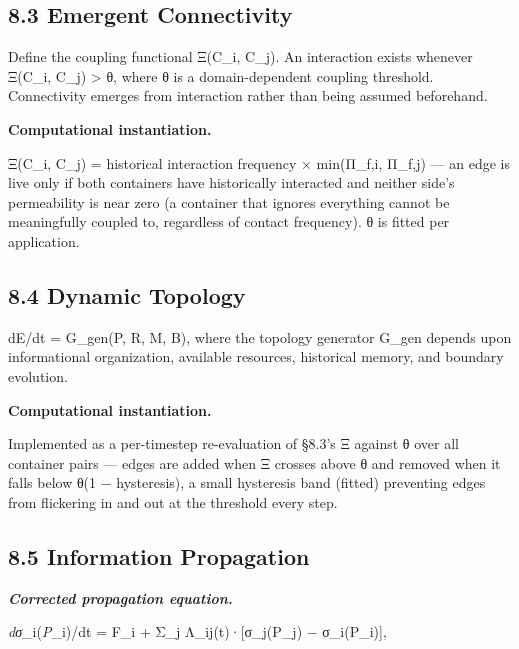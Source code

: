 \documentclass[
]{article}
\begin{document}
\hypertarget{emergent-connectivity}{%
\subsection{8.3 Emergent Connectivity}\label{emergent-connectivity}}

Define the coupling functional Ξ(C\_i, C\_j). An interaction exists
whenever Ξ(C\_i, C\_j) \textgreater{} θ, where θ is a domain-dependent
coupling threshold. Connectivity emerges from interaction rather than
being assumed beforehand.

\textbf{Computational instantiation.}

Ξ(C\_i, C\_j) = historical interaction frequency × min(Π\_f,i, Π\_f,j)
--- an edge is live only if both containers have historically interacted
and neither side's permeability is near zero (a container that ignores
everything cannot be meaningfully coupled to, regardless of contact
frequency). θ is fitted per application.

\hypertarget{dynamic-topology}{%
\subsection{8.4 Dynamic Topology}\label{dynamic-topology}}

dE/dt = G\_gen(P, R, M, B), where the topology generator G\_gen depends
upon informational organization, available resources, historical memory,
and boundary evolution.

\textbf{Computational instantiation.}

Implemented as a per-timestep re-evaluation of §8.3's Ξ against θ over
all container pairs --- edges are added when Ξ crosses above θ and
removed when it falls below θ(1 − hysteresis), a small hysteresis band
(fitted) preventing edges from flickering in and out at the threshold
every step.

\hypertarget{information-propagation}{%
\subsection{8.5 Information Propagation}\label{information-propagation}}

\emph{\textbf{Corrected propagation equation.}}

\emph{dσ}\_i(\emph{P}\_i)/dt = F\_i + Σ\_j Λ\_ij(t)·{[}σ\_j(P\_j) −
σ\_i(P\_i){]},
\end{document}
